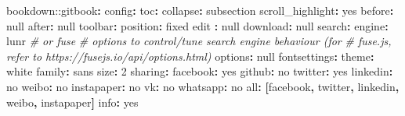 \documentclass[
  12pt,
]{krantz}
\newenvironment{Shaded}{\begin{snugshade}}{\end{snugshade}}
\newcommand{\AttributeTok}[1]{\textcolor[rgb]{0.77,0.63,0.00}{#1}}
\newcommand{\CharTok}[1]{\textcolor[rgb]{0.31,0.60,0.02}{#1}}
\newcommand{\CommentTok}[1]{\textcolor[rgb]{0.56,0.35,0.01}{\textit{#1}}}
\newcommand{\DecValTok}[1]{\textcolor[rgb]{0.00,0.00,0.81}{#1}}
\newcommand{\FunctionTok}[1]{\textcolor[rgb]{0.00,0.00,0.00}{#1}}
\newcommand{\KeywordTok}[1]{\textcolor[rgb]{0.13,0.29,0.53}{\textbf{#1}}}
\newcommand{\StringTok}[1]{\textcolor[rgb]{0.31,0.60,0.02}{#1}}
\theoremstyle{definition}
\theoremstyle{definition}
\theoremstyle{definition}
\theoremstyle{definition}
\theoremstyle{remark}
\begin{document}
\begin{Shaded}
\begin{Highlighting}[]
\AttributeTok{bookdown:}\FunctionTok{:gitbook}\KeywordTok{:}
\AttributeTok{  }\FunctionTok{config}\KeywordTok{:}
\AttributeTok{    }\FunctionTok{toc}\KeywordTok{:}
\AttributeTok{      }\FunctionTok{collapse}\KeywordTok{:}\AttributeTok{ subsection}
\AttributeTok{      }\FunctionTok{scroll\_highlight}\KeywordTok{:}\AttributeTok{ }\CharTok{yes}
\AttributeTok{      }\FunctionTok{before}\KeywordTok{:}\AttributeTok{ }\CharTok{null}
\AttributeTok{      }\FunctionTok{after}\KeywordTok{:}\AttributeTok{ }\CharTok{null}
\AttributeTok{    }\FunctionTok{toolbar}\KeywordTok{:}
\AttributeTok{      }\FunctionTok{position}\KeywordTok{:}\AttributeTok{ fixed}
\AttributeTok{    }\FunctionTok{edit }\KeywordTok{:}\AttributeTok{ }\CharTok{null}
\AttributeTok{    }\FunctionTok{download}\KeywordTok{:}\AttributeTok{ }\CharTok{null}
\AttributeTok{    }\FunctionTok{search}\KeywordTok{:}
\AttributeTok{      }\FunctionTok{engine}\KeywordTok{:}\AttributeTok{ lunr}\CommentTok{ \# or fuse}
\CommentTok{      \# options to control/tune search engine behaviour (for}
\CommentTok{      \# fuse.js, refer to https://fusejs.io/api/options.html)}
\AttributeTok{      }\FunctionTok{options}\KeywordTok{:}\AttributeTok{ }\CharTok{null}
\AttributeTok{    }\FunctionTok{fontsettings}\KeywordTok{:}
\AttributeTok{      }\FunctionTok{theme}\KeywordTok{:}\AttributeTok{ white}
\AttributeTok{      }\FunctionTok{family}\KeywordTok{:}\AttributeTok{ sans}
\AttributeTok{      }\FunctionTok{size}\KeywordTok{:}\AttributeTok{ }\DecValTok{2}
\AttributeTok{    }\FunctionTok{sharing}\KeywordTok{:}
\AttributeTok{      }\FunctionTok{facebook}\KeywordTok{:}\AttributeTok{ }\CharTok{yes}
\AttributeTok{      }\FunctionTok{github}\KeywordTok{:}\AttributeTok{ }\CharTok{no}
\AttributeTok{      }\FunctionTok{twitter}\KeywordTok{:}\AttributeTok{ }\CharTok{yes}
\AttributeTok{      }\FunctionTok{linkedin}\KeywordTok{:}\AttributeTok{ }\CharTok{no}
\AttributeTok{      }\FunctionTok{weibo}\KeywordTok{:}\AttributeTok{ }\CharTok{no}
\AttributeTok{      }\FunctionTok{instapaper}\KeywordTok{:}\AttributeTok{ }\CharTok{no}
\AttributeTok{      }\FunctionTok{vk}\KeywordTok{:}\AttributeTok{ }\CharTok{no}
\AttributeTok{      }\FunctionTok{whatsapp}\KeywordTok{:}\AttributeTok{ }\CharTok{no}
\AttributeTok{      }\FunctionTok{all}\KeywordTok{:}\AttributeTok{ }\KeywordTok{[}\StringTok{\textquotesingle{}facebook\textquotesingle{}}\KeywordTok{,}\AttributeTok{ }\StringTok{\textquotesingle{}twitter\textquotesingle{}}\KeywordTok{,}\AttributeTok{ }\StringTok{\textquotesingle{}linkedin\textquotesingle{}}\KeywordTok{,}\AttributeTok{ }\StringTok{\textquotesingle{}weibo\textquotesingle{}}\KeywordTok{,}\AttributeTok{ }\StringTok{\textquotesingle{}instapaper\textquotesingle{}}\KeywordTok{]}
\AttributeTok{    }\FunctionTok{info}\KeywordTok{:}\AttributeTok{ }\CharTok{yes}
\end{Highlighting}
\end{Shaded}
\end{document}
